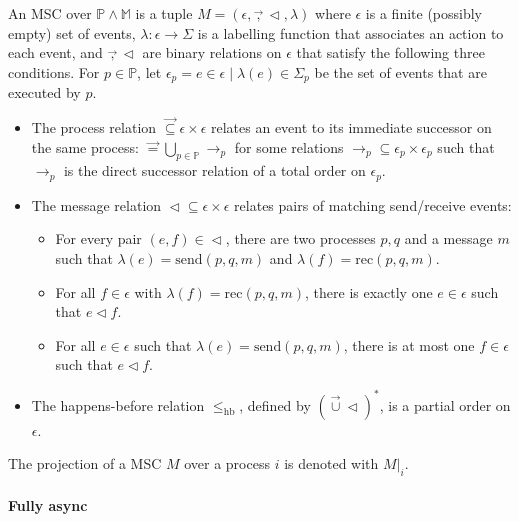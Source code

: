 \begin{definition}
An MSC over $ \mathbb{P} \land \mathbb{M} $ is a tuple $ M = (\epsilon, \vec, \vartriangleleft, \lambda)$
where $ \epsilon $ is a finite (possibly empty) set of events, $ \lambda: \epsilon \to \Sigma $ is a
labelling function that associates an action to each event, and $ \vec, \vartriangleleft $ are binary
relations on $ \epsilon $ that satisfy the following three conditions. For $ p \in \mathbb{P} $, let
$\epsilon_p = { e \in \epsilon \mid \lambda(e) \in \Sigma_p } $ be the set of events that are executed by $ p $.

\begin{itemize}
    \item The process relation $ \vec \subseteq \epsilon \times \epsilon $ relates an event to its immediate
    successor on the same process: $ \vec = \bigcup_{p \in \mathbb{P}} \to_p $ for some relations 
    $ \to_p \subseteq \epsilon_p \times \epsilon_p $ such that $ \to_p $ is the direct successor
    relation of a total order on $ \epsilon_p $.
    \item The message relation $ \vartriangleleft \subseteq \epsilon \times \epsilon $ relates pairs 
    of matching send/receive events:
    \begin{itemize}
    \item For every pair $(e, f) \in \vartriangleleft$, there are two processes $ p, q $ and a message 
    $ m $ such that $ \lambda(e) = \text{send}(p, q, m) $ and $ \lambda(f) = \text{rec}(p, q, m) $.
    \item For all $ f \in \epsilon $ with $ \lambda(f) = \text{rec}(p, q, m) $, there is exactly one
     $ e \in \epsilon $ such that $ e \vartriangleleft f $.
    \item For all $ e \in \epsilon $ such that $ \lambda(e) = \text{send}(p, q, m) $, there is at 
    most one $ f \in \epsilon $ such that $ e \vartriangleleft f $.
    \end{itemize}
    \item The happens-before relation $ \le_\text{hb} $, defined by $(\vec \cup \vartriangleleft)^* $,
    is a partial order on $ \epsilon $. 
\end{itemize}
\end{definition}

The projection of a MSC $M$ over a process $i$ is denoted with $M|_i$.

\paragraph{Fully async}

